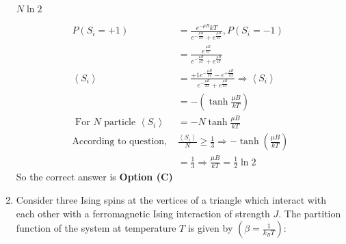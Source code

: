 \begin{enumerate}
\begin{tasks}
	\task[\textbf{D.}]  $N \ln 2$
\end{tasks}
\begin{answer}
	\begin{align*}
	P\left(S_{i}=+1\right)&=\frac{e^{-\mu B}{k T}}{e^{-\frac{\mu B}{k T}}+e^{\frac{\mu B}{k T}}}, P\left(S_{i}=-1\right)\\&=\frac{e^{\frac{\mu B}{k T}}}{e^{-\frac{\mu B}{k T}}+e^{\frac{\mu B}{k T}}}\\
	\left\langle S_{i}\right\rangle&=\frac{+1 e^{-\frac{\mu B}{k T}}-e^{+\frac{\mu B}{k T}}}{e^{-\frac{\mu B}{k T}}+e^{\frac{\mu B}{k T}}} \Rightarrow\left\langle S_{i}\right\rangle\\&=-\left(\tanh \frac{\mu B}{k T}\right)\\
	\text{	For $N$ particle }\left\langle S_{i}\right\rangle&=-N \tanh \frac{\mu B}{k T}\\
	\text{According to question, }&\frac{\left\langle S_{i}\right\rangle}{N} \geq \frac{1}{3} \Rightarrow-\tanh \left(\frac{\mu B}{k T}\right)\\&=\frac{1}{3} \Rightarrow \frac{\mu B}{k T}=\frac{1}{2} \ln 2
	\end{align*}
	So the correct answer is \textbf{Option (C)}
\end{answer}
	\item Consider three Ising spins at the vertices of a triangle which interact with each other with a ferromagnetic Ising interaction of strength $J .$ The partition function of the system at temperature $T$ is given by $\left(\beta=\frac{1}{k_{B} T}\right):$
	{}


\end{enumerate}
